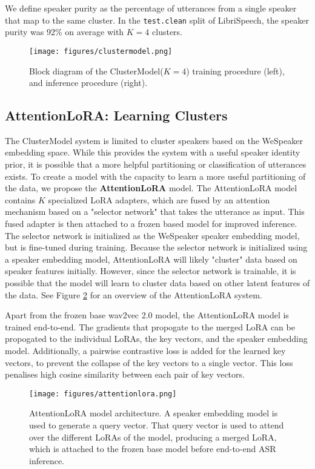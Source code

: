 We define speaker purity as the percentage of utterances from a single speaker that map to the same cluster.
In the \verb|test.clean| split of LibriSpeech, the speaker purity was 92\% on average with $K=4$ clusters.

\begin{figure}[h]
      \centering
      \texttt{[image: figures/clustermodel.png]}
      \caption{Block diagram of the ClusterModel($K=4$) training procedure (left), and inference procedure (right).}
      \label{fig:clustermodel}
\end{figure}

\subsection{AttentionLoRA: Learning Clusters}

The ClusterModel system is limited to cluster speakers based on the WeSpeaker embedding space.
While this provides the system with a useful speaker identity prior, it is possible that a more helpful partitioning or classification of utterances exists.
To create a model with the capacity to learn a more useful partitioning of the data, we propose the \textbf{AttentionLoRA} model.
The AttentionLoRA model contains $K$ specialized LoRA adapters, which are fused by an attention mechanism based on a "selector network" that takes the utterance as input.
This fused adapter is then attached to a frozen based model for improved inference.
The selector network is initialized as the WeSpeaker speaker embedding model, but is fine-tuned during training.
Because the selector network is initialized using a speaker embedding model, AttentionLoRA will likely "cluster" data based on speaker features initially.
However, since the selector network is trainable, it is possible that the model will learn to cluster data based on other latent features of the data.
See Figure \ref{fig:attentionlora} for an overview of the AttentionLoRA system.


Apart from the frozen base wav2vec 2.0 model, the AttentionLoRA model is trained end-to-end.
The gradients that propogate to the merged LoRA can be propogated to the individual LoRAs, the key vectors, and the speaker embedding model.
Additionally, a pairwise contrastive loss is added for the learned key vectors, to prevent the collapse of the key vectors to a single vector.
This loss penalises high cosine similarity between each pair of key vectors.

\begin{figure}
      \centering
      \texttt{[image: figures/attentionlora.png]}
      \caption{AttentionLoRA model architecture. A speaker embedding model is used to generate a query vector.
      That query vector is used to attend over the different LoRAs of the model, producing a merged LoRA, which is attached to the frozen base model before end-to-end ASR inference.}
      \label{fig:attentionlora}
\end{figure}

